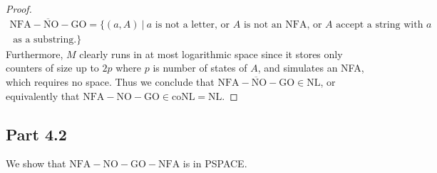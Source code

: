 \documentclass[a4paper,11pt]{article}
\newcommand{\pipe}{\ \vert \ }
\numberwithin{equation}{section}
\begin{document}
\begin{proof}
\begin{equation*}
			\begin{aligned}
			\overline{\mathrm{NFA-NO-GO}}=\{(a,A)\pipe a\text{ is not a letter, or }A \text{ is not an NFA, or }A\text{ accept a string with }a\\
			\text{ as a substring.}   \}
			\end{aligned}
		\end{equation*}
		Furthermore, $ M $ clearly runs in at most logarithmic space since it stores only counters of size up to $ 2p $ where $ p $ is number of states of $ A $, and simulates an NFA, which requires no space. Thus we conclude that $ \overline{\mathrm{NFA-NO-GO}}\in \text{NL} $, or equivalently that $ \mathrm{NFA-NO-GO}\in\text{coNL}=\text{NL} $.
	\end{proof}
	\subsection*{Part 4.2}
	We show that $ \mathrm{NFA-NO-GO-NFA} $ is in PSPACE.
\end{document}
